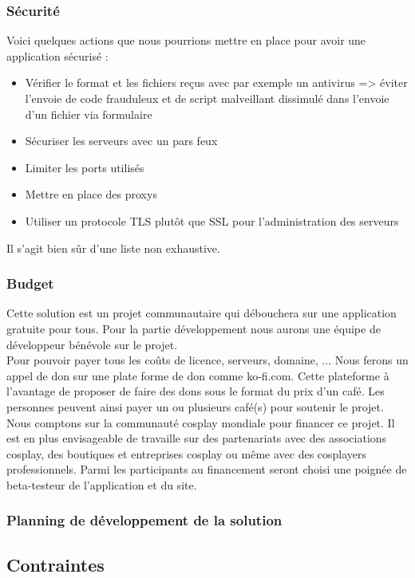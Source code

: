 \documentclass[a4paper,12pt]{article}
\begin{document}
\subsubsection{Sécurité}
Voici quelques actions que nous pourrions mettre en place pour avoir une application sécurisé : 
\begin{itemize}
    \item Vérifier le format et les fichiers reçus avec par exemple un antivirus => éviter l'envoie de code frauduleux et de script malveillant dissimulé dans l'envoie d'un fichier via formulaire 
    \item Sécuriser les serveurs avec un pars feux 
    \item Limiter les ports utilisés
    \item Mettre en place des proxys
    \item Utiliser un protocole TLS plutôt que SSL pour l'administration des serveurs
\end{itemize}
Il s'agit bien sûr d'une liste non exhaustive. 

\subsubsection{Budget}
Cette solution est un projet communautaire qui débouchera sur une application gratuite pour tous. Pour la partie développement nous aurons une équipe de développeur bénévole sur le projet. \\
Pour pouvoir payer tous les coûts de licence, serveurs, domaine, ... Nous ferons un appel de don sur une plate forme de don comme ko-fi.com. Cette plateforme à l'avantage de proposer de faire des dons sous le format du prix d'un café. Les personnes peuvent ainsi payer un ou plusieurs café(s) pour soutenir le projet. Nous comptons sur la communauté cosplay mondiale pour financer ce projet. Il est en plus envisageable de travaille sur des partenariats avec des associations cosplay, des boutiques et entreprises cosplay ou même avec des cosplayers professionnels. 
Parmi les participants au financement seront choisi une poignée de beta-testeur de l'application et du site. 

\subsubsection{Planning de développement de la solution}

\subsection{Contraintes}
\end{document}

